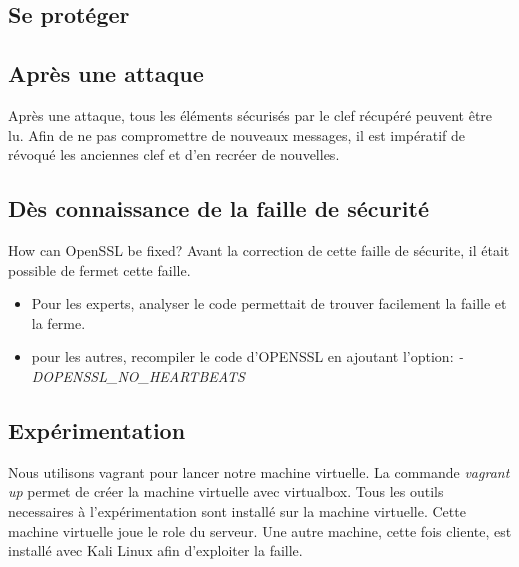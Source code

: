 \documentclass[a4paper,oneside,1pt]{article}
\begin{document}
\subsection{Se protéger}

\subsection{Après une attaque}

Après une attaque, tous les éléments sécurisés par le clef récupéré peuvent être lu. Afin de ne pas compromettre de nouveaux messages, il est impératif de révoqué les anciennes clef et d'en recréer de nouvelles. 

\subsection{Dès connaissance de la faille de sécurité}
How can OpenSSL be fixed?
Avant la correction de cette faille de sécurite, il était possible de fermet cette faille. 
\begin{itemize}
	\item Pour les experts, analyser le code permettait de trouver facilement la faille et la ferme. 
	\item pour les autres, recompiler le code d'OPENSSL en ajoutant l'option: \textit{-DOPENSSL\_NO\_HEARTBEATS}
\end{itemize}



\subsection{Expérimentation}

Nous utilisons vagrant pour lancer notre machine virtuelle. La commande \textit{vagrant up} permet de créer la machine virtuelle avec virtualbox. Tous les outils necessaires à l'expérimentation sont installé sur la machine virtuelle. Cette machine virtuelle joue le role du serveur. Une autre machine, cette fois cliente, est installé avec Kali Linux afin d'exploiter la faille. 
\end{document}
